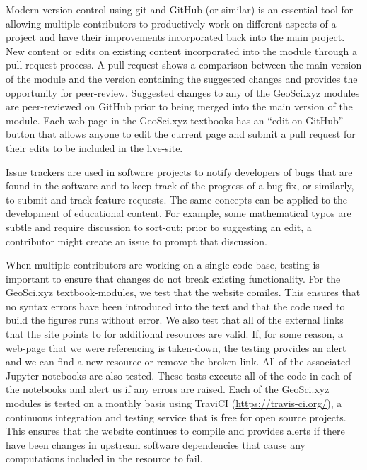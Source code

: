 Modern version control using git and GitHub (or similar) is an essential tool for allowing multiple contributors to productively work on different aspects of a project and have their improvements incorporated back into the main project. New content or edits on existing content incorporated into the module through a pull-request process. A pull-request shows a comparison between the main version of the module and the version containing the suggested changes and provides the opportunity for peer-review. Suggested changes to any of the GeoSci.xyz modules are peer-reviewed on GitHub prior to being merged into the main version of the module. Each web-page in the GeoSci.xyz textbooks has an ``edit on GitHub'' button that allows anyone to edit the current page and submit a pull request for their edits to be included in the live-site.

Issue trackers are used in software projects to notify developers of bugs that are found in the software and to keep track of the progress of a bug-fix, or similarly, to submit and track feature requests. The same concepts can be applied to the development of educational content. For example, some mathematical typos are subtle and require discussion to sort-out; prior to suggesting an edit, a contributor might create an issue to prompt that discussion.

When multiple contributors are working on a single code-base, testing is important to ensure that changes do not break existing functionality. For the GeoSci.xyz textbook-modules, we test that the website comiles. This ensures that no syntax errors have been introduced into the text and that the code used to build the figures runs without error. We also test that all of the external links that the site points to for additional resources are valid. If, for some reason, a web-page that we were referencing is taken-down, the testing provides an alert and we can find a new resource or remove the broken link. All of the associated Jupyter notebooks are also tested. These tests execute all of the code in each of the notebooks and alert us if any errors are raised. Each of the GeoSci.xyz modules is tested on a monthly basis using TraviCI (\href{https://travis-ci.org/}{https://travis-ci.org/}), a continuous integration and testing service that is free for open source projects. This ensures that the website continues to compile and provides alerts if there have been changes in upstream software dependencies that cause any computations included in the resource to fail.

